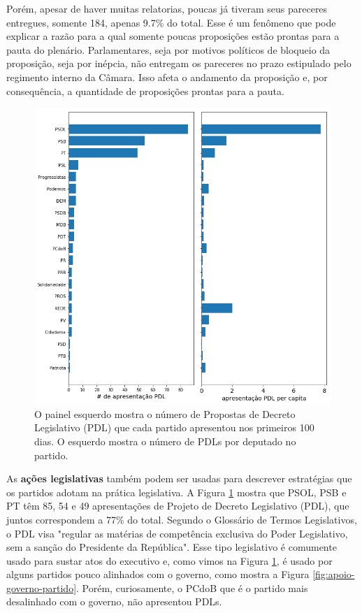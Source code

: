 \documentclass[12pt,a4paper]{article}
\begin{document}
Porém, apesar de haver muitas relatorias, poucas já tiveram seus pareceres entregues, somente 184, apenas 9.7\% do total. Esse é um fenômeno que pode explicar a razão para a qual somente poucas proposições estão prontas para a pauta do plenário. Parlamentares, seja por motivos políticos de bloqueio da proposição, seja por inépcia, não entregam os pareceres no prazo estipulado pelo regimento interno da Câmara. Isso afeta o andamento da proposição e, por consequência, a quantidade de proposições prontas para a pauta.

\begin{figure}[H]
\centering
\includegraphics[width=1.0\textwidth]{graficos/camara/atividade/PDL.png}
\caption{O painel esquerdo mostra o número de Propostas de Decreto Legislativo (PDL) que cada partido apresentou nos primeiros 100 dias. O esquerdo mostra o número de PDLs por deputado no partido. }
\label{fig:atividade-parlamentar-pdl-partidos}
\end{figure} 

As \textbf{ações legislativas} também podem ser usadas para descrever estratégias que os partidos adotam na prática legislativa. A Figura \ref{fig:atividade-parlamentar-pdl-partidos} mostra que PSOL, PSB e PT têm 85, 54 e 49 apresentações de Projeto de Decreto Legislativo (PDL), que juntos correspondem a 77\% do total. Segundo o Glossário de Termos Legislativos, o PDL visa "regular as matérias de competência exclusiva do Poder Legislativo, sem a sanção do Presidente da República". Esse tipo legislativo é comumente usado para sustar atos do executivo e, como vimos na Figura \ref{fig:atividade-parlamentar-pdl-partidos}, é usado por alguns partidos pouco alinhados com o governo, como mostra a Figura \ref{fig:apoio-governo-partido}. Porém, curiosamente, o PCdoB que é o partido mais desalinhado com o governo, não apresentou PDLs. 
\end{document}
